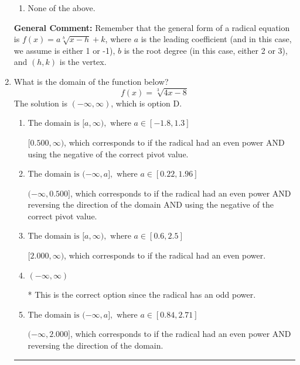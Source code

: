 \documentclass{extbook}[14pt]
\newcommand{\litem}[1]{\item #1

\rule{\textwidth}{0.4pt}}
\begin{document}
\begin{enumerate}
{\begin{enumerate}[label=\Alph*.]
\item None of the above.\end{enumerate}
\textbf{General Comment:} Remember that the general form of a radical equation is $ f(x) = a \sqrt[b]{x - h} + k $, where $a$ is the leading coefficient (and in this case, we assume is either 1 or -1), $b$ is the root degree (in this case, either 2 or 3), and $(h, k)$ is the vertex.
}
\litem{
What is the domain of the function below?
\[ f(x) = \sqrt[3]{4 x - 8} \]
The solution is \( (-\infty, \infty) \), which is option D.\begin{enumerate}[label=\Alph*.]
\item \( \text{The domain is } [a, \infty), \text{   where } a \in [-1.8, 1.3] \)

$[0.500, \infty)$, which corresponds to if the radical had an even power AND using the negative of the correct pivot value.
\item \( \text{The domain is } (-\infty, a], \text{   where } a \in [0.22, 1.96] \)

$(-\infty, 0.500]$, which corresponds to if the radical had an even power AND reversing the direction of the domain AND using the negative of the correct pivot value.
\item \( \text{The domain is } [a, \infty), \text{   where } a \in [0.6, 2.5] \)

$[2.000, \infty)$, which corresponds to if the radical had an even power.
\item \( (-\infty, \infty) \)

* This is the correct option since the radical has an odd power.
\item \( \text{The domain is } (-\infty, a], \text{   where } a \in [0.84, 2.71] \)

$(-\infty, 2.000]$, which corresponds to if the radical had an even power AND reversing the direction of the domain.
\end{enumerate}

}
\end{enumerate}
\end{document}
